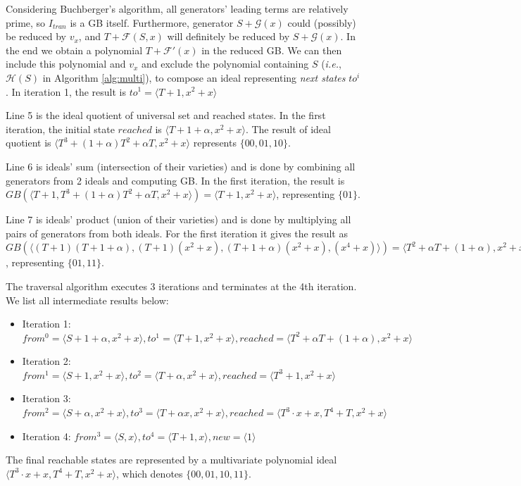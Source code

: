 \begin{Example}
Considering Buchberger's algorithm, all generators' leading terms are relatively prime, so $I_{tran}$ is a GB itself. 
Furthermore, generator $S + \mathcal G(x)$ could (possibly) be reduced by $v_x$,
and $T+\mathcal F(S,x)$ will definitely be reduced by $S + \mathcal G(x)$. In the end we obtain a polynomial
$T + \mathcal F'(x)$ in the reduced GB. We can then include this polynomial and $v_x$ and exclude the polynomial containing
$S$ ({\it i.e.}, $\mathcal H(S)$ in Algorithm \ref{alg:multi}), to compose an ideal representing \emph{next states} $to^i$. 
In iteration 1, the result is $to^1 = \langle T+1, x^2+x\rangle$

Line 5 is the ideal quotient of universal set and reached states. In the first iteration, 
the initial state $reached$ is $\langle T+1+\alpha, x^2+x \rangle$. The result of ideal quotient
is $\langle T^3+(1+\alpha)T^2+\alpha T, x^2+x\rangle$ represents $\{00,01,10\}$.

Line 6 is ideals' sum (intersection of their varieties) and is done by combining all generators
from 2 ideals and computing GB. In the first iteration, the result is $GB(\langle T+1,T^3+(1+\alpha)T^2+\alpha T, x^2+x\rangle) = \langle T+1, x^2+x\rangle$,
representing $\{01\}$.

Line 7 is ideals' product (union of their varieties) and is done by multiplying all pairs of
generators from both ideals. For the first iteration it gives the result as $GB(\langle (T+1)(T+1+\alpha),
(T+1)(x^2+x), (T+1+\alpha)(x^2+x), (x^4+x)\rangle) = \langle T^2+\alpha T+(1+\alpha), x^2+x\rangle$, representing $\{01,11\}$.

The traversal algorithm executes 3 iterations and terminates at the 4th iteration. We list all intermediate 
results below:
\begin{itemize}
\item Iteration 1: $from^0 = \langle S+1+\alpha, x^2+x\rangle, to^1 = \langle T+1, x^2+x\rangle,
 reached = \langle T^2+\alpha T+(1+\alpha), x^2+x\rangle$
\item Iteration 2: $from^1 = \langle S+1, x^2+x\rangle, to^2= \langle T+\alpha, x^2+x\rangle,
reached = \langle T^3+1, x^2+x\rangle$
\item Iteration 3: $from^2 = \langle S+\alpha, x^2+x\rangle, to^3 = \langle T+\alpha x, x^2+x
\rangle, reached = \langle T^3\cdot x+x, T^4+T, x^2+x\rangle$
\item Iteration 4: $from^3 = \langle S, x\rangle, to^4 = \langle T+1, x\rangle, new = \langle1\rangle$
\end{itemize}
The final reachable states are represented by a multivariate polynomial ideal $\langle T^3\cdot x+x, T^4+T, x^2+x\rangle$,
which denotes $\{00,01,10,11\}$.
\end{Example}

